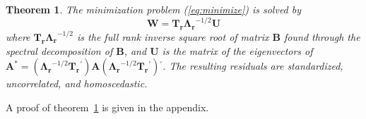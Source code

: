 \documentclass{article} %
\newtheorem{theorem}{Theorem}
\newcommand{\trans}{\ensuremath{^\prime}}
\newcommand{\var}{\ensuremath{\mathrm{Var}}}
\begin{document}
\begin{theorem}\label{thm1}
The minimization problem (\ref{eq:minimize}) is solved by 
\[
\bm{W} = \bm{T_r \Lambda_r}^{-1/2} \bm{U} 
\]
where $\bm{T_r \Lambda_r}^{-1/2}$ is the full rank inverse square root of matrix $\bm{B}$ found through the spectral decomposition of $\bm{B}$, and $\bm{U}$ is the matrix of %
the eigenvectors of $ \bm{A^*} = (\bm{\Lambda_r}^{-1/2} \bm{T_r}\trans) \bm{A} (\bm{\Lambda_r}^{-1/2} \bm{T_r}\trans)\trans$. The resulting residuals are standardized, uncorrelated, and homoscedastic.
%


\end{theorem}
A proof of theorem~\ref{thm1} is given in the appendix.
\end{document}
